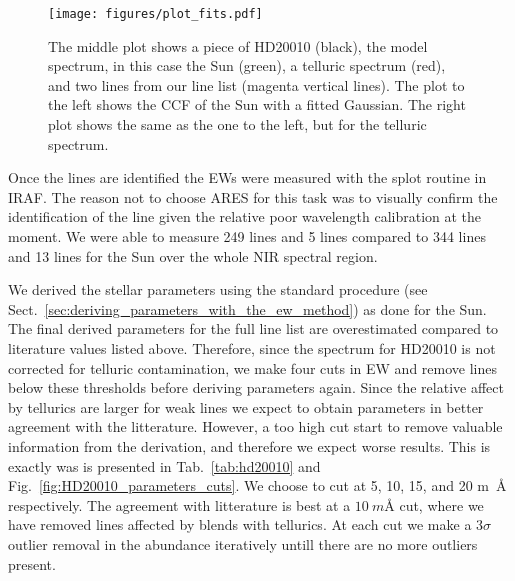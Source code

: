 \documentclass{aa}
\begin{document}
\begin{figure}[tbp!]
    \centering
    \texttt{[image: figures/plot\_fits.pdf]}
    \caption{The middle plot shows a piece of HD20010 (black), the model
    spectrum, in this case the Sun (green), a telluric spectrum (red), and two
    lines from our line list (magenta vertical lines). The plot to the left
    shows the CCF of the Sun with a fitted Gaussian. The right plot shows the
    same as the one to the left, but for the telluric spectrum.}
    \label{fig:plot_fits}
\end{figure}

Once the lines are identified the EWs were measured with the splot
routine in IRAF. The reason not to choose ARES for this task was to
visually confirm the identification of the line given the relative
poor wavelength calibration at the moment. We were able to measure 249
 lines and 5  lines compared to 344 
lines and 13  lines for the Sun over the whole NIR spectral
region.

We derived the stellar parameters using the standard procedure
(see Sect.~\ref{sec:deriving_parameters_with_the_ew_method}) as
done for the Sun. The final derived parameters for the full line
list are overestimated compared to literature values listed above.
Therefore, since the spectrum for HD20010 is not corrected for
telluric contamination, we make four cuts in EW and remove lines below
these thresholds before deriving parameters again. Since the relative
affect by tellurics are larger for weak lines we expect to obtain
parameters in better agreement with the litterature. However, a too
high cut start to remove valuable information from the derivation, and
therefore we expect worse results. This is exactly was is presented in
Tab.~\ref{tab:hd20010} and Fig.~\ref{fig:HD20010_parameters_cuts}. We
choose to cut at 5, 10, 15, and 20 \si{m\angstrom} respectively. The
agreement with litterature is best at a $\SI{10}{m\angstrom}$ cut,
where we have removed lines affected by blends with tellurics.
At each cut we make a $3 \sigma$ outlier removal in the abundance
iteratively untill there are no more outliers present.
\end{document}
